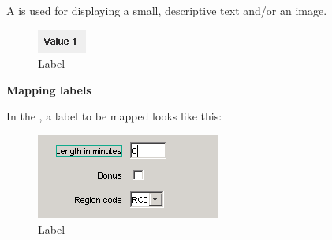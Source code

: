 A  is used for displaying a small, descriptive text and/or an image.



\begin{figure}
\begin{center}
\includegraphics{PS/Label}
\caption{Label}
\label{label}
\end{center}
\end{figure}

\textbf{Mapping labels}

In the \gdomm{}, a label to be mapped looks like this:

\begin{figure}
\begin{center}
\includegraphics{PS/Maplabel}
\caption{Label}
\label{maplabel}
\end{center}
\end{figure}
